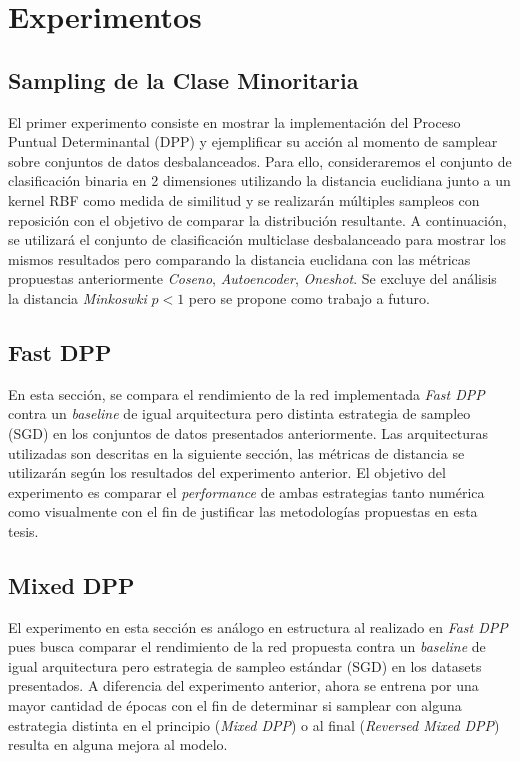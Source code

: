 \section{Experimentos}

\subsection{Sampling de la Clase Minoritaria}\label{experiment:sampling}

El primer experimento consiste en mostrar la implementación del Proceso Puntual Determinantal (DPP) y ejemplificar su acción al momento de samplear sobre conjuntos de datos desbalanceados. Para ello, consideraremos el conjunto de clasificación binaria en 2 dimensiones utilizando la distancia euclidiana junto a un kernel RBF como medida de similitud y se realizarán múltiples sampleos con reposición con el objetivo de comparar la distribución resultante. A continuación, se utilizará el conjunto de clasificación multiclase desbalanceado para mostrar los mismos resultados pero comparando la distancia euclidana con las métricas propuestas anteriormente \textit{Coseno}, \textit{Autoencoder}, \textit{Oneshot}. Se excluye del análisis la distancia \textit{Minkoswki} $p<1$ pero se propone como trabajo a futuro.

\subsection{Fast DPP}\label{experiment:fast_dpp}

En esta sección, se compara el rendimiento de la red implementada \textit{Fast DPP} contra un \textit{baseline} de igual arquitectura pero distinta estrategia de sampleo (SGD) en los conjuntos de datos presentados anteriormente. Las arquitecturas utilizadas son descritas en la siguiente sección, las métricas de distancia se utilizarán según los resultados del experimento anterior. El objetivo del experimento es comparar el \textit{performance} de ambas estrategias tanto numérica como visualmente con el fin de justificar las metodologías propuestas en esta tesis. 

\subsection{Mixed DPP}\label{experiment:mixed_dpp}

El experimento en esta sección es análogo en estructura al realizado en \textit{Fast DPP} pues busca comparar el rendimiento de la red propuesta contra un \textit{baseline} de igual arquitectura pero estrategia de sampleo estándar (SGD) en los datasets presentados. A diferencia del experimento anterior, ahora se entrena por una mayor cantidad de épocas con el fin de determinar si samplear con alguna estrategia distinta en el principio (\textit{Mixed DPP}) o al final (\textit{Reversed Mixed DPP}) resulta en alguna mejora al modelo. 

